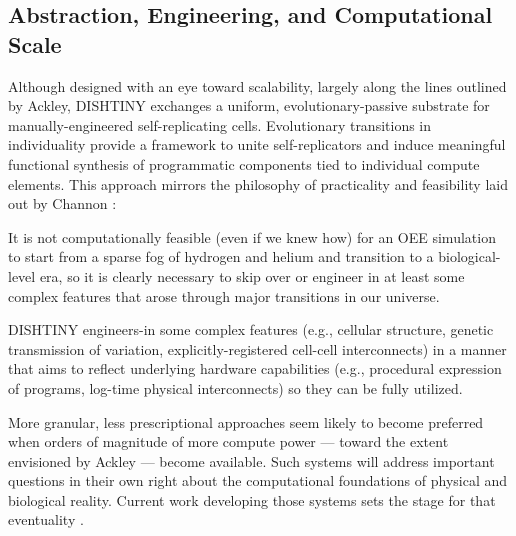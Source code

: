 \subsection{Abstraction, Engineering, and Computational Scale}

Although designed with an eye toward scalability, largely along the lines outlined by Ackley, DISHTINY exchanges a uniform, evolutionary-passive substrate for manually-engineered %
self-replicating cells.
Evolutionary transitions in individuality provide a framework to unite self-replicators and induce meaningful functional synthesis of programmatic components tied to individual compute elements.
This approach mirrors the philosophy of practicality and feasibility laid out by Channon \citep{channon2019maximum}:

\begin{displayquote}
It is not computationally feasible (even if we knew how) for an OEE simulation to start from a sparse fog of hydrogen and helium and transition to a biological-level era, so it is clearly necessary to skip over or engineer in at least some complex features that arose through major transitions in our universe.
\end{displayquote}

DISHTINY engineers-in some complex features (e.g., cellular structure, genetic transmission of variation, explicitly-registered cell-cell interconnects) in a manner that aims to reflect underlying hardware capabilities (e.g., procedural expression of programs, log-time physical interconnects) so they can be fully %
utilized.

More granular, less prescriptional approaches seem likely to become %
preferred when orders of magnitude of more compute power --- toward the extent envisioned by Ackley --- become available.
Such systems will address important questions in their own right about the computational foundations of physical and biological reality.
Current work developing those systems sets the stage for that eventuality \citep{ackley2018alife}.

